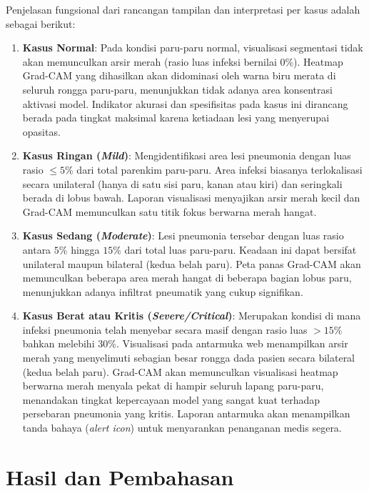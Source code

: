 \documentclass[12pt,a4paper,oneside]{book}
\begin{document}
Penjelasan fungsional dari rancangan tampilan dan interpretasi per kasus adalah sebagai berikut:
\begin{enumerate}
  \item \textbf{Kasus Normal}:
    Pada kondisi paru-paru normal, visualisasi segmentasi tidak akan memunculkan arsir merah (rasio luas infeksi bernilai $0\%$). Heatmap Grad-CAM yang dihasilkan akan didominasi oleh warna biru merata di seluruh rongga paru-paru, menunjukkan tidak adanya area konsentrasi aktivasi model. Indikator akurasi dan spesifisitas pada kasus ini dirancang berada pada tingkat maksimal karena ketiadaan lesi yang menyerupai opasitas.
  \item \textbf{Kasus Ringan (\textit{Mild})}:
    Mengidentifikasi area lesi pneumonia dengan luas rasio $\le 5\%$ dari total parenkim paru-paru. Area infeksi biasanya terlokalisasi secara unilateral (hanya di satu sisi paru, kanan atau kiri) dan seringkali berada di lobus bawah. Laporan visualisasi menyajikan arsir merah kecil dan Grad-CAM memunculkan satu titik fokus berwarna merah hangat.
  \item \textbf{Kasus Sedang (\textit{Moderate})}:
    Lesi pneumonia tersebar dengan luas rasio antara $5\%$ hingga $15\%$ dari total luas paru-paru. Keadaan ini dapat bersifat unilateral maupun bilateral (kedua belah paru). Peta panas Grad-CAM akan memunculkan beberapa area merah hangat di beberapa bagian lobus paru, menunjukkan adanya infiltrat pneumatik yang cukup signifikan.
  \item \textbf{Kasus Berat atau Kritis (\textit{Severe/Critical})}:
    Merupakan kondisi di mana infeksi pneumonia telah menyebar secara masif dengan rasio luas $>15\%$ bahkan melebihi $30\%$. Visualisasi pada antarmuka web menampilkan arsir merah yang menyelimuti sebagian besar rongga dada pasien secara bilateral (kedua belah paru). Grad-CAM akan memunculkan visualisasi heatmap berwarna merah menyala pekat di hampir seluruh lapang paru-paru, menandakan tingkat kepercayaan model yang sangat kuat terhadap persebaran pneumonia yang kritis. Laporan antarmuka akan menampilkan tanda bahaya (\textit{alert icon}) untuk menyarankan penanganan medis segera.
\end{enumerate}

\chapter[HASIL DAN PEMBAHASAN]{Hasil dan Pembahasan}
\end{document}
